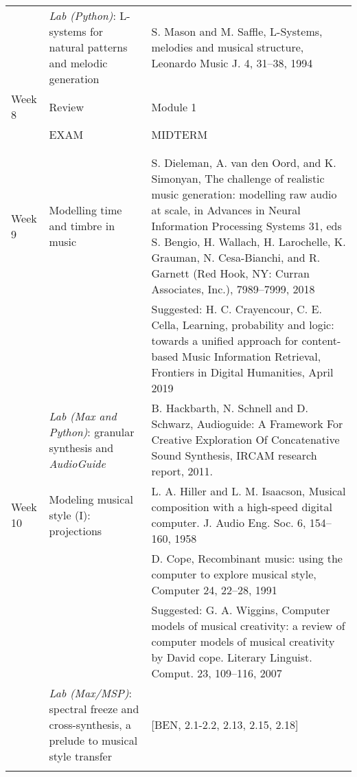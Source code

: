 \documentclass[letterpaper]{inzane_syllabus} %
\begin{document}
\begin{center}
\begin{tabularx}{\textwidth}{p{2cm}p{8cm} @{\hskip 0.5cm} p{9.5cm}}
&  \emph{Lab (Python)}: L-systems for natural patterns and melodic generation &  S. Mason and M. Saffle, L-Systems, melodies and musical structure, Leonardo Music J. 4, 31–38, 1994 \\
\arrayrulecolor{maingray}\hline

 Week 8 & Review & Module 1 \\
 &EXAM &  MIDTERM \\
& & \\ 
 \arrayrulecolor{myCOLOR}\hline
\multicolumn{2}{l}{\textbf{\textcolor{myCOLOR}{\large MODULE 2: Transformations }}} \\
\hline

Week 9 & Modelling time and timbre in music & S. Dieleman, A.  van den Oord,  and K. Simonyan, The challenge of realistic music generation: modelling raw audio at scale, in Advances in Neural Information Processing Systems 31, eds S. Bengio, H. Wallach, H. Larochelle, K. Grauman, N. Cesa-Bianchi, and R. Garnett (Red Hook, NY: Curran Associates,
Inc.), 7989–7999, 2018 \\
& &  Suggested: H. C. Crayencour, C. E. Cella, Learning, probability and logic: towards a unified approach for content-based Music Information Retrieval, Frontiers in Digital Humanities, April 2019 \\

& \emph{Lab (Max and Python)}: granular synthesis and \emph{AudioGuide} & B. Hackbarth, N. Schnell and D. Schwarz, Audioguide: A Framework For Creative Exploration Of Concatenative Sound Synthesis, IRCAM research report, 2011. \\

\arrayrulecolor{maingray}\hline

Week 10 & Modeling musical style (I): projections & L. A. Hiller and L. M. Isaacson, Musical composition with a high-speed
digital computer. J. Audio Eng. Soc. 6, 154–160, 1958 \\
& & D. Cope, Recombinant music: using the computer to explore musical style, Computer 24, 22–28, 1991 \\
& &  Suggested: G. A. Wiggins, Computer models of musical creativity: a review of computer models of musical creativity by David cope. Literary Linguist. Comput. 23, 109–116, 2007 \\

&   \emph{Lab (Max/MSP)}: spectral freeze and cross-synthesis, a prelude to musical style transfer & [BEN, 2.1-2.2, 2.13, 2.15, 2.18] \\
\arrayrulecolor{maingray}\hline


\end{tabularx}
\end{center}
\end{document}

